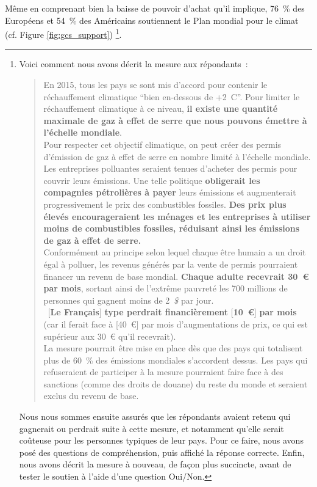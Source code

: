 \documentclass[a5paper,french,openany]{memoir}
\begin{document}
Même en comprenant bien la baisse de pouvoir d'achat qu'il implique, 76~\% des Européens et 54~\% des Américains soutiennent le Plan mondial pour le climat (cf. Figure \ref{fig:gcs_support})
\footnote{\label{fn15}
Voici comment nous avons décrit la mesure aux répondants~:
\begin{quote}
En 2015, tous les pays se sont mis d'accord pour contenir le réchauffement climatique ``bien en-dessous de +2~\textdegree{}C''. Pour limiter le réchauffement climatique à ce niveau, \textbf{il existe une quantité maximale de gaz à effet de serre que nous pouvons émettre à l'échelle mondiale}. \\
Pour respecter cet objectif climatique, on peut créer des permis d'émission de gaz à effet de serre en nombre limité à l'échelle mondiale. Les entreprises polluantes seraient tenues d'acheter des permis pour couvrir leurs émissions. Une telle politique \textbf{obligerait les compagnies pétrolières à payer} leurs émissions et augmenterait progressivement le prix des combustibles fossiles. \textbf{Des prix plus élevés encourageraient les ménages et les entreprises à utiliser moins de combustibles fossiles, réduisant ainsi les émissions de gaz à effet de serre.} \\
Conformément au principe selon lequel chaque être humain a un droit égal à polluer, les revenus générés par la vente de permis pourraient financer un revenu de base mondial. \textbf{Chaque adulte recevrait 30~\euro{} par mois}, sortant ainsi de l'extrême pauvreté les 700 millions de personnes qui gagnent moins de 2~\textit{\$} par jour. \\
~[\textbf{Le Français}]\textbf{ type perdrait financièrement }[\textbf{10~\euro{}}]\textbf{ par mois}\footnotemark{\label{fn16}} 
(car il ferait face à [40~\euro{}] par mois d'augmentations de prix, ce qui est supérieur aux 30~\euro{} qu'il recevrait). \\
La mesure pourrait être mise en place dès que des pays qui totalisent plus de 60~\% des émissions mondiales s'accordent dessus. Les pays qui refuseraient de participer à la mesure pourraient faire face à des sanctions (comme des droits de douane) du reste du monde et seraient exclus du revenu de base.
\end{quote}
Nous nous sommes ensuite assurés que les répondants avaient retenu qui gagnerait ou perdrait suite à cette mesure, et notamment qu'elle serait coûteuse pour les personnes typiques de leur pays. Pour ce faire, nous avons posé des questions de compréhension, puis affiché la réponse correcte. Enfin, nous avons décrit la mesure à nouveau, de façon plus succincte, avant de tester le soutien à l'aide d'une question Oui/Non.}. 
\end{document}
